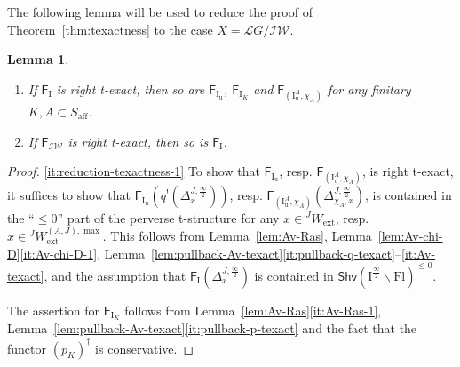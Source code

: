 \documentclass[11pt]{amsart}
\numberwithin{equation}{section}
\theoremstyle{plain}
\newtheorem{lem}[thm]{Lemma}
\theoremstyle{definition}
\newcommand{\I}{{\mathrm I}}
\newcommand{\sL}{{\mathcal L}}
\newcommand{\semi}{{{\frac{\infty}{2}}}}
\newcommand{\IW}{\mathcal{IW}}
\newcommand{\ex}{\mathrm{ext}}
\newcommand{\af}{\mathrm{aff}}
\newcommand{\Shv}{\mathsf{Shv}}
\newcommand{\Fl}{\mathrm{Fl}}
\newcommand{\Iu}{\mathrm{I}_{\mathrm{u}}}
\begin{document}
The following lemma will be used to reduce the proof of Theorem~\ref{thm:texactness} to the case $X=\sL{G}/\IW$. 

\begin{lem}
\label{lem:reduction-texactness}
\begin{enumerate}
\item 
\label{it:reduction-texactness-1}
If $\mathsf{F}_\I$ is right t-exact, then so are $\mathsf{F}_{\Iu}$, $\mathsf{F}_{\I_K}$ and $\mathsf{F}_{(\Iu^A,\chi_A)}$ for any finitary $K,A \subset S_\af$. 
\item 
\label{it:reduction-texactness-2}
If $\mathsf{F}_{\IW}$ is right t-exact, then so is $\mathsf{F}_\I$. 
\end{enumerate}
\end{lem}

\begin{proof}
\eqref{it:reduction-texactness-1}
To show that $\mathsf{F}_{\Iu}$, resp. $\mathsf{F}_{(\Iu^A,\chi_A)}$, is right t-exact, it suffices to show that $\mathsf{F}_{\Iu}(q^!(\Delta_x^{J,\semi}))$, resp. $\mathsf{F}_{(\Iu^A,\chi_A)}(\Delta^{J,\semi}_{\chi_A,x})$, is contained in the ``$\leq 0$'' part of the perverse t-structure for any $x\in {}^JW_\ex$, resp. $x\in {}^JW_\ex^{(A,J),\max}$. 
This follows from Lemma~\ref{lem:Av-Ras}, Lemma~\ref{lem:Av-chi-D}\eqref{it:Av-chi-D-1}, Lemma~\ref{lem:pullback-Av-texact}\eqref{it:pullback-q-texact}--\eqref{it:Av-texact}, and the assumption that $\mathsf{F}_{\I}(\Delta_x^{J,\semi})$ is contained in $\Shv(\I^\semi\backslash \Fl)^{\leq 0}$. 

The assertion for $\mathsf{F}_{\I_K}$ follows from Lemma~\ref{lem:Av-Ras}\eqref{it:Av-Ras-1}, Lemma~\ref{lem:pullback-Av-texact}\eqref{it:pullback-p-texact} and the fact that the functor $(p_K)^\dag$ is conservative. 


\end{proof}
\end{document}
